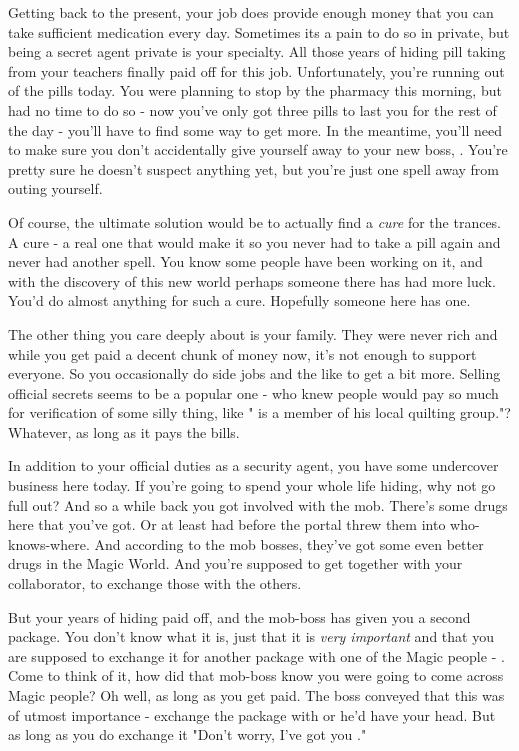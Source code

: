 \documentclass[char]{guildcamp3}
\begin{document}
Getting back to the present, your job does provide enough money that you can take sufficient medication every day. Sometimes its a pain to do so in private, but being a secret agent private is your specialty. All those years of hiding pill taking from your teachers finally paid off for this job. Unfortunately, you're running out of the pills today. You were planning to stop by the pharmacy this morning, but had no time to do so - now you've only got three pills to last you for the rest of the day - you'll have to find some way to get more. In the meantime, you'll need to make sure you don't accidentally give yourself away to your new boss, \cSpecOpOne{}. You're pretty sure he doesn't suspect anything yet, but you're just one spell away from outing yourself. 

Of course, the ultimate solution would be to actually find a \emph{cure} for the trances. A cure - a real one that would make it so you never had to take a pill again and never had another spell. You know some people have been working on it, and with the discovery of this new world perhaps someone there has had more luck. You'd do almost anything for such a cure. Hopefully someone here has one.  

The other thing you care deeply about is your family. They were never rich and while you get paid a decent chunk of money now, it's not enough to support everyone. So you occasionally do side jobs and the like to get a bit more. Selling official secrets seems to be a popular one - who knew people would pay so much for verification of some silly thing, like "\cPoliOne{} is a member of his local quilting group."? Whatever, as long as it pays the bills. 

In addition to your official duties as a security agent, you have some undercover business here today. If you're going to spend your whole life hiding, why not go full out? And so a while back you got involved with the mob. There's some drugs here that you've got. Or at least had before the portal threw them into who-knows-where. And according to the mob bosses, they've got some even better drugs in the Magic World. And you're supposed to get together with your collaborator, \cPoliTwo{\informal} to exchange those with the others. 

But your years of hiding paid off, and the mob-boss has given you a second package. You don't know what it is, just that it is \emph{very important} and that you are supposed to exchange it for another package with one of the Magic people - \cServant{\intro}. Come to think of it, how did that mob-boss know you were going to come across Magic people? Oh well, as long as you get paid. The boss conveyed that this was of utmost importance - exchange the package with \cServant{} or he'd have your head. But as long as you do exchange it "Don't worry, I've got you \cSpecOpTwo{\informal}." 
\end{document}
